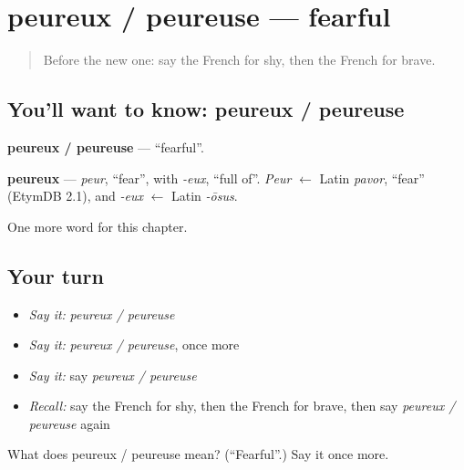 \section[peureux / peureuse]{peureux / peureuse — fearful}

\label{lesson:FR-C190-peureux-peureuse}



\begin{quote}
Before the new one: say the French for shy, then the French for brave.
\end{quote}

\subsection*{You'll want to know: peureux / peureuse}
\textbf{peureux / peureuse} — \textquotedblleft{}fearful\textquotedblright{}.

\begin{cousinweb}
\textbf{peureux} — \emph{peur}, \textquotedblleft{}fear\textquotedblright{}, with \emph{-eux}, \textquotedblleft{}full of\textquotedblright{}. \emph{Peur} $\leftarrow$ Latin \emph{pavor}, \textquotedblleft{}fear\textquotedblright{} (EtymDB 2.1), and \emph{-eux} $\leftarrow$ Latin \emph{-ōsus}.
\end{cousinweb}

\begin{grammarlens}[title={What you've built}]
One more word for this chapter.
\end{grammarlens}

\subsection*{Your turn}
\begin{itemize}
\raggedright
  \item \emph{Say it:} \emph{peureux / peureuse}
  \item \emph{Say it:} \emph{peureux / peureuse}, once more
  \item \emph{Say it:} say \emph{peureux / peureuse}
  \item \emph{Recall:} say the French for shy, then the French for brave, then say \emph{peureux / peureuse} again
\end{itemize}

\begin{tcolorbox}[breakable,colback=teal!4,colframe=teal!35!black,title={Before you move on}]
What does peureux / peureuse mean? (\textquotedblleft{}Fearful\textquotedblright{}.) Say it once more.
\end{tcolorbox}
